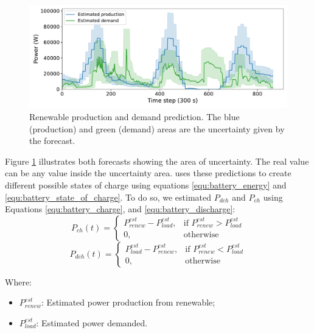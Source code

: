 \begin{figure}[!htb]
    \centering
    \includegraphics[scale=0.5]{Images/Heuristic/predictions.pdf}
    \caption{Renewable production and demand prediction. The blue (production) and green (demand) areas are the uncertainty given by the forecast.}
    \label{fig:predictions}
\end{figure}

Figure \ref{fig:predictions} illustrates both forecasts showing the area of uncertainty. The real value can be any value inside the uncertainty area. \emph{\systemName} uses these predictions to create different possible states of charge using equations \ref{equ:battery_energy} and \ref{equ:battery_state_of_charge}. To do so, we estimated $P_{dch}$ and $P_{ch}$ using Equations \ref{equ:battery_charge}, and \ref{equ:battery_discharge}: 
\begin{equation}
    \label{equ:battery_charge}
    P_{ch}(t) = 
    \begin{cases}
        P_{renew}^{est} - P_{load}^{est},& \text{if } P_{renew}^{est} > P_{load}^{est} \\
        0,              & \text{otherwise}
    \end{cases}
\end{equation}
\begin{equation}
    \label{equ:battery_discharge}
    P_{dch}(t) = 
    \begin{cases}
        P_{load}^{est} - P_{renew}^{est},& \text{if } P_{renew}^{est} < P_{load}^{est} \\
        0,              & \text{otherwise}
    \end{cases}
\end{equation}

Where:
\begin{itemize}
    \item \(P_{renew}^{est}\): Estimated power production from renewable;
    \item \(P_{load}^{est}\): Estimated power demanded.
\end{itemize}

